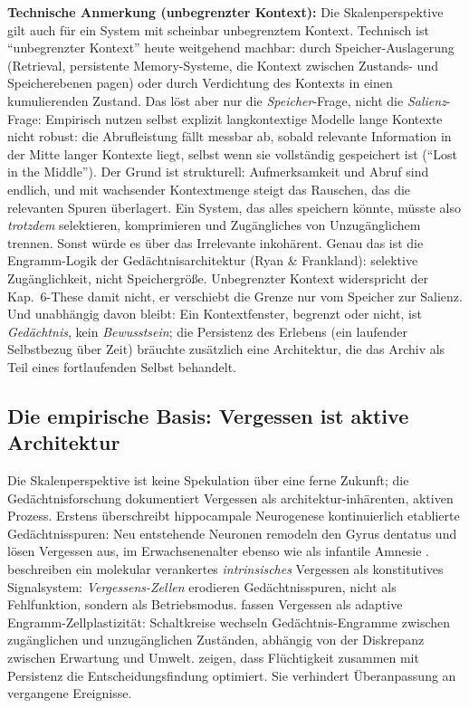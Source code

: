 \documentclass[acmlarge, noacm]{acmart}
\begin{document}
\textbf{Technische Anmerkung (unbegrenzter Kontext):} Die Skalenperspektive gilt auch für ein System mit scheinbar unbegrenztem Kontext. Technisch ist ``unbegrenzter Kontext'' heute weitgehend machbar: durch Speicher-Auslagerung (Retrieval, persistente Memory-Systeme, die Kontext zwischen Zustands- und Speicherebenen pagen) oder durch Verdichtung des Kontexts in einen kumulierenden Zustand. Das löst aber nur die \textit{Speicher}-Frage, nicht die \textit{Salienz}-Frage: Empirisch nutzen selbst explizit langkontextige Modelle lange Kontexte nicht robust: die Abrufleistung fällt messbar ab, sobald relevante Information in der Mitte langer Kontexte liegt, selbst wenn sie vollständig gespeichert ist \cite{liu2024} (``Lost in the Middle''). Der Grund ist strukturell: Aufmerksamkeit und Abruf sind endlich, und mit wachsender Kontextmenge steigt das Rauschen, das die relevanten Spuren überlagert. Ein System, das alles speichern könnte, müsste also \textit{trotzdem} selektieren, komprimieren und Zugängliches von Unzugänglichem trennen. Sonst würde es über das Irrelevante inkohärent. Genau das ist die Engramm-Logik der Gedächtnisarchitektur (Ryan \& Frankland): selektive Zugänglichkeit, nicht Speichergröße. Unbegrenzter Kontext widerspricht der Kap.~6-These damit nicht, er verschiebt die Grenze nur vom Speicher zur Salienz. Und unabhängig davon bleibt: Ein Kontextfenster, begrenzt oder nicht, ist \textit{Gedächtnis}, kein \textit{Bewusstsein}; die Persistenz des Erlebens (ein laufender Selbstbezug über Zeit) bräuchte zusätzlich eine Architektur, die das Archiv als Teil eines fortlaufenden Selbst behandelt.

\subsection{Die empirische Basis: Vergessen ist aktive Architektur}

Die Skalenperspektive ist keine Spekulation über eine ferne Zukunft; die Gedächtnisforschung dokumentiert Vergessen als architektur-inhärenten, aktiven Prozess. Erstens überschreibt hippocampale Neurogenese kontinuierlich etablierte Gedächtnisspuren: Neu entstehende Neuronen remodeln den Gyrus dentatus und lösen Vergessen aus, im Erwachsenenalter ebenso wie als infantile Amnesie \cite{akers2014}. \citet{davis_zhong2017} beschreiben ein molekular verankertes \textit{intrinsisches} Vergessen als konstitutives Signalsystem: \textit{Vergessens-Zellen} erodieren Gedächtnisspuren, nicht als Fehlfunktion, sondern als Betriebsmodus. \citet{ryan2022} fassen Vergessen als adaptive Engramm-Zellplastizität: Schaltkreise wechseln Gedächtnis-Engramme zwischen zugänglichen und unzugänglichen Zuständen, abhängig von der Diskrepanz zwischen Erwartung und Umwelt. \citet{richards_frankland2017} zeigen, dass Flüchtigkeit zusammen mit Persistenz die Entscheidungsfindung optimiert. Sie verhindert Überanpassung an vergangene Ereignisse.
\end{document}
